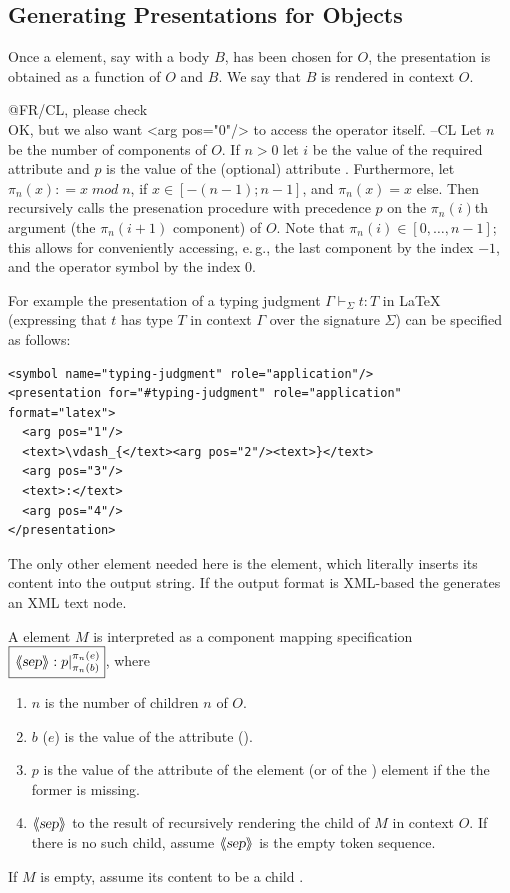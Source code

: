 \documentclass[a4paper]{article}
\def\llquote#1{\ensuremath{\langle\kern-.25em\langle\hbox{\sl{#1}}\rangle\kern-.25em\rangle}}
\def\fimarg#1#2#3{\fbox{\ensuremath{\left.#1\right|_{#2}^{#3}}}}
\def\recu#1{#1}%
\begin{document}
\subsection{Generating Presentations for {\openmath} Objects}

Once a {} element, say with a body $B$, has been chosen for $O$, the
presentation is obtained as a function of $O$ and $B$. We say that $B$ is rendered in
context $O$.

\begin{newpart}{@FR/CL, please check\\
  OK, but we also want <arg pos="0"/> to access the operator itself. --CL}
Let $n$ be the number of components of $O$. If $n>0$ let $i$ be the value of the required
attribute {} and $p$ is the value of the (optional) attribute
{}. Furthermore, let $\pi_n(x)\colon=x\;mod\;n$, if $x\in
[-(n-1);n-1]$, and $\pi_n(x)=x$ else. Then {} recursively calls the
presenation procedure with precedence $p$ on the $\pi_n(i)$th argument (the $\pi_n(i+1)$
component) of $O$. Note that $\pi_n(i)\in [0,\ldots,n-1]$; this allows for conveniently
accessing, e.\,g., the last component by the index $-1$, and the operator symbol by the
index $0$.

For example the presentation of a typing judgment $\Gamma\vdash_\Sigma t:T$ in {\LaTeX}
(expressing that $t$ has type $T$ in context $\Gamma$ over the signature $\Sigma$) can be
specified as follows:
\begin{lstlisting}[mathescape,label={lst:typing-judgment},
                   caption={Presenting a Typing Judgment}]
<symbol name="typing-judgment" role="application"/>
<presentation for="#typing-judgment" role="application" format="latex">
  <arg pos="1"/>
  <text>\vdash_{</text><arg pos="2"/><text>}</text>
  <arg pos="3"/>
  <text>:</text>
  <arg pos="4"/>
</presentation>
\end{lstlisting}
\end{newpart}
The only other element needed here is the {} element, which literally
inserts its content into the output string. If the output format is XML-based the
{} generates an XML text node.

A {} element $M$ is interpreted as a component mapping
specification $\fimarg{\llquote{sep}:\recu{p}}{\pi_n(b)}{\pi_n(e)}$, where
\begin{enumerate}
\item $n$ is the number of children $n$ of $O$.
\item $b$ ($e$) is the value of the attribute {}
  ({}). 
\item $p$ is the value of the {} attribute of the
  {} element (or of the ) element if the the former
  is missing.
\item $\llquote{sep}$ to the result of recursively rendering the {}
  child of $M$ in context $O$. If there is no such child, assume $\llquote{sep}$ is the
  empty token sequence.
\end{enumerate}
If $M$ is empty, assume its content to be a child {}.
\end{document}
